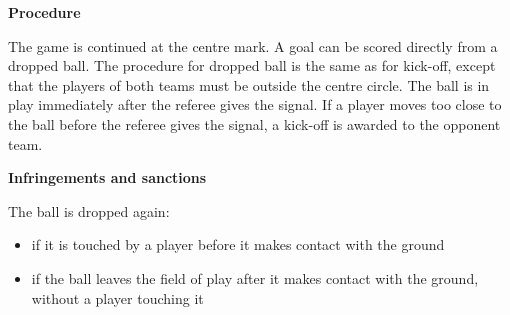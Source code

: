 \bigskip

{\bfseries Procedure}

\headlinebox

The game is continued at the centre mark. A goal can be scored directly from a dropped ball. The procedure for dropped ball is the same as for kick-off, except that the players of both teams must be outside the centre circle. The ball is in play immediately
after the referee gives the signal. If a player moves too close to the ball before the referee gives the signal, a kick-off
is awarded to the opponent team.



\bigskip

{\bfseries Infringements and sanctions}

\headlinebox

The ball is dropped again:

\begin{itemize}
\item if it is touched by a player before it makes contact with the ground 
\item if the ball leaves the field of play after it makes contact with the ground, without a player touching it
\end{itemize}

\bigskip

